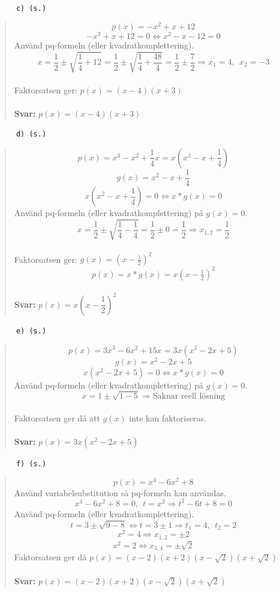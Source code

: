 \documentclass[a4paper]{article}
\newcommand{\tskcol}[1]{\textcolor{tskcol}{#1}}
\begin{document}
	\texttt{\tskcol{~~~~~~c) (s.)}}
	\begin{quotation}
		\noindent
		\[p(x)=-x^2+x+12\]
		\[-x^2+x+12=0 \Leftrightarrow x^2-x-12=0\]
		Använd pq-formeln (eller kvadratkomplettering).
		\[x=\frac{1}{2}\pm\sqrt{\frac{1}{4}+12}=
		\frac{1}{2}\pm\sqrt{\frac{1}{4}+\frac{48}{4}}=
		\frac{1}{2}\pm \frac{7}{2}
		\Rightarrow x_1=4,~~x_2=-3\] \\
		Faktorsatsen ger: $p(x)=(x-4)(x+3)$
		\\ \\
		\textbf{Svar:} $p(x)=(x-4)(x+3)$
	\end{quotation}
	
	\texttt{\tskcol{~~~~~~d) (s.)}}
	\begin{quotation}
		\noindent
		\[p(x)=x^3-x^2+\frac{1}{4}x=x\left(x^2-x+\frac{1}{4}\right)\]
		\[g(x)=x^2-x+\frac{1}{4}\]
		\[x(x^2-x+\frac{1}{4})=0 \Leftrightarrow x*g(x)=0\]
		Använd pq-formeln (eller kvadratkomplettering) på $g(x)=0$.
		\[x=\frac{1}{2}\pm\sqrt{\frac{1}{4}-\frac{1}{4}}=
		\frac{1}{2}\pm 0=
		\frac{1}{2}
		\Rightarrow x_{1,2}=\frac{1}{2}\] \\
		Faktorsatsen ger: $g(x)=(x-\frac{1}{2})^2$
		\[p(x)=x*g(x)=x(x-\tfrac{1}{2})^2\]
		\\
		\textbf{Svar:} $p(x)=x\left(x-\dfrac{1}{2}\right)^2$
	\end{quotation}
	
	\texttt{\tskcol{~~~~~~e) (s.)}}
	\begin{quotation}
		\noindent
		\[p(x)=3x^3-6x^2+15x=3x(x^2-2x+5)\]
		\[g(x)=x^2-2x+5\]
		\[x(x^2-2x+5)=0 \Leftrightarrow x*g(x)=0\]
		Använd pq-formeln (eller kvadratkomplettering) på $g(x)=0$.
		\[x=1\pm\sqrt{1-5} \Rightarrow \text{Saknar reell lösning}\] \\
		Faktorsatsen ger då att $g(x)$ inte kan faktoriseras.
		\\ \\
		\textbf{Svar:} $p(x)=3x(x^2-2x+5)$
	\end{quotation}
	
	\texttt{\tskcol{~~~~~~f) (s.)}}
	\begin{quotation}
		\noindent
		\[p(x)=x^4-6x^2+8\]
		Använd variabelsubstitution så pq-formeln kan användas.
		\[x^4-6x^2+8=0,~~t=x^2 \Rightarrow t^2-6t+8=0\]
		Använd pq-formeln (eller kvadratkomplettering).
		\[t=3\pm\sqrt{9-8} \Leftrightarrow t=3\pm 1 \Rightarrow t_1=4,~~t_2=2\]
		\[x^2=4 \Leftrightarrow x_{1,2}=\pm 2\]
		\[x^2=2 \Leftrightarrow x_{3,4}=\pm \sqrt{2}\]
		Faktorsatsen ger då $p(x)=(x-2)(x+2)(x-\sqrt{2})(x+\sqrt{2})$
		\\ \\
		\textbf{Svar:} $p(x)=(x-2)(x+2)(x-\sqrt{2})(x+\sqrt{2})$
	\end{quotation}
	
\end{document}
